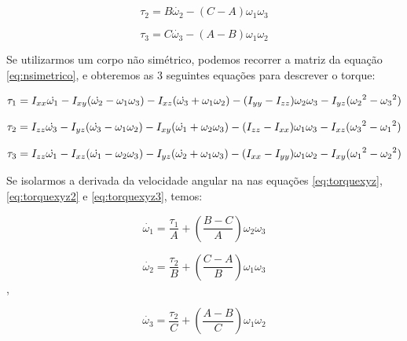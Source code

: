 \begin{equation}
  \tau_2=B\dot{\omega_2}-(C-A)\omega_1\omega_3 
\end{equation}

\begin{equation}
  \tau_3=C\dot{\omega_3}-(A-B)\omega_1\omega_2
\end{equation}

Se utilizarmos um corpo não simétrico, podemos recorrer a matriz da equação \ref{eq:nsimetrico}, e obteremos as 3 seguintes equações para descrever o torque:

\begin{equation}\label{eq:torquexyz}
 \tau_{1}=I_{xx}\dot{\omega_{1}}-I_{xy}(\dot{\omega_{2}}-\omega_{1}\omega_{3})-I_{xz}(\dot{\omega_{3}}+\omega_{1}\omega_{2})\\-(I_{yy}-I_{zz})\omega_{2}\omega_{3}-I_{yz}({\omega_{2}}^{2}-{\omega_{3}}^{2})
\end{equation}

\begin{equation}\label{eq:torquexyz2}
  \tau_{2}=I_{zz}\dot{\omega_{3}}-I_{yz}(\dot{\omega_{3}}-\omega_{1}\omega_{2})-I_{xy}(\dot{\omega_{1}}+\omega_{2}\omega_{3})\\-(I_{zz}-I_{xx})\omega_{1}\omega_{3}-I_{xz}({\omega_{3}}^{2}-{\omega_{1}}^{2})
\end{equation}

\begin{equation}\label{eq:torquexyz3}
 \tau_{3}=I_{zz}\dot{\omega_{1}}-I_{xz}(\dot{\omega_{1}}-\omega_{2}\omega_{3})-I_{yz}(\dot{\omega_{2}}+\omega_{1}\omega_{3})\\-(I_{xx}-I_{yy})\omega_{1}\omega_{2}-I_{xy}({\omega_{1}}^{2}-{\omega_{2}}^{2})
\end{equation}

Se isolarmos a derivada da velocidade angular na nas equações \ref{eq:torquexyz}, \ref{eq:torquexyz2} e \ref{eq:torquexyz3}, temos:

\begin{equation}
  \dot{\omega_{1}}=\frac{\tau_{1}}{A}+\left(\frac{B-C}{A}\right)\omega_{2}\omega_{3}
\end{equation}

\begin{equation}
  \dot{\omega_{2}}=\frac{\tau_{2}}{B}+\left(\frac{C-A}{B}\right)\omega_{1}\omega_{3}
\end{equation},

\begin{equation}
  \dot{\omega_{3}}=\frac{\tau_{2}}{C}+\left(\frac{A-B}{C}\right)\omega_{1}\omega_{2}
\end{equation}

